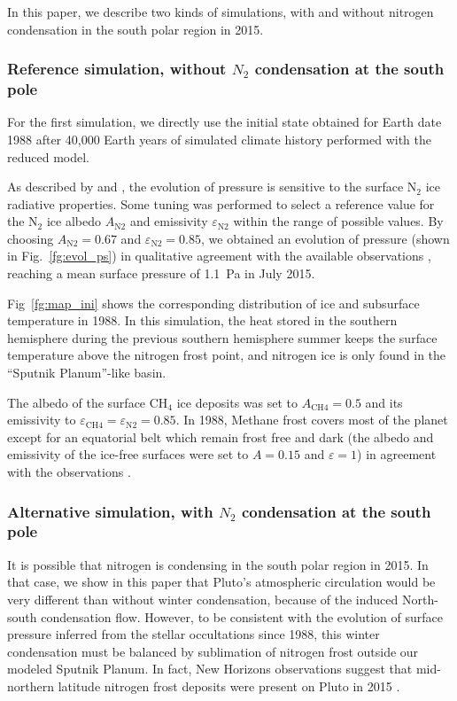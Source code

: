 \label{sc:kinds}

In this paper, we describe two kinds of simulations, with and without nitrogen condensation in
the south polar region in 2015.

\subsubsection{Reference simulation, without $N_2$ condensation at the south pole}

For the first simulation, we directly use the initial state obtained for Earth date 1988 
after 40,000 Earth years of simulated climate history performed with the reduced model.

As described by \cite{Hans:96} and \cite{Youn:13}, the evolution of pressure is
sensitive to the surface N$_2$ ice radiative properties.  Some
tuning was performed to select a reference
value for the N$_2$ ice albedo $A_{\mbox{N2}}$ 
and emissivity $\varepsilon_{\mbox{N2}}$ within the range of
possible values.  By choosing  $A_{\mbox{N2}}=0.67$ and $\varepsilon_{\mbox{N2}}=0.85$, we 
obtained an evolution
of pressure (shown in Fig.~\ref{fg:evol_ps}) in qualitative agreement with the available
observations \citep{Sica:16,Glad:16}, reaching a mean surface pressure of 1.1~Pa in July 2015.

Fig~\ref{fg:map_ini} shows the corresponding distribution of ice and subsurface
temperature in 1988. In this simulation, the heat stored in the southern hemisphere during the previous
southern hemisphere summer keeps the surface temperature above the nitrogen frost point, and nitrogen
ice is only found in the ``Sputnik Planum''-like basin. 

The albedo of the surface CH$_4$ ice deposits was set to 
$A_{\mbox{CH4}}=0.5$ and its emissivity to  $\varepsilon_{\mbox{CH4}}= \varepsilon_{\mbox{N2}}=0.85$.
In 1988, Methane frost covers most of the planet except for an equatorial belt which remain frost free and dark
(the albedo and emissivity of the ice-free surfaces were set to $A=0.15$ and $\varepsilon=1$)
in agreement with the observations \citep{Ster:15,Grun:16}. 
 
\subsubsection{Alternative simulation, with $N_2$ condensation at the south pole}

It is possible that nitrogen is condensing in the south polar region in 2015. In that case, we show
in this paper that Pluto's atmospheric 
circulation would be very different than without winter condensation, 
because of the induced North-south condensation flow. 
However, to be consistent with the evolution of surface pressure inferred from the stellar
occultations since 1988, this winter condensation must be balanced by sublimation of nitrogen
frost outside our modeled Sputnik Planum.  In fact, New
Horizons observations suggest that mid-northern latitude nitrogen frost deposits were present on Pluto
in 2015 \citep{Grun:16}. 

